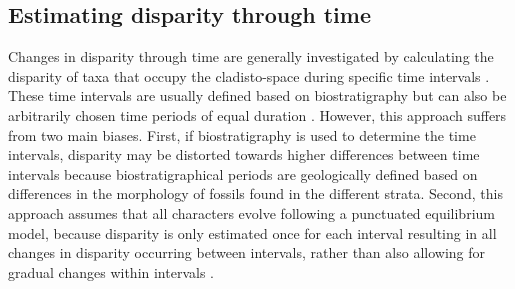 \subsection{Estimating disparity through time} 
Changes in disparity through time are generally investigated by calculating the disparity of taxa that occupy the cladisto-space during specific time intervals \citep[e.g][]{cisneros2010,prentice2011,Hughes20082013,hopkinsdecoupling2013,bentonmodels2014,bensonfaunal2014}.
These time intervals are usually defined based on biostratigraphy \citep[e.g.][]{cisneros2010,prentice2011,Hughes20082013,bentonmodels2014} but can also be arbitrarily chosen time periods of equal duration \citep{Butler2012,hopkinsdecoupling2013,bensonfaunal2014}.
However, this approach suffers from two main biases. 
First, if biostratigraphy is used to determine the time intervals, disparity may be distorted towards higher differences between time intervals because biostratigraphical periods are geologically defined based on differences in the morphology of fossils found in the different strata.
Second, this approach assumes that all characters evolve following a punctuated equilibrium model, because disparity is only estimated once for each interval resulting in all changes in disparity occurring between intervals, rather than also allowing for gradual changes within intervals \citep{Hunt21042015}.

